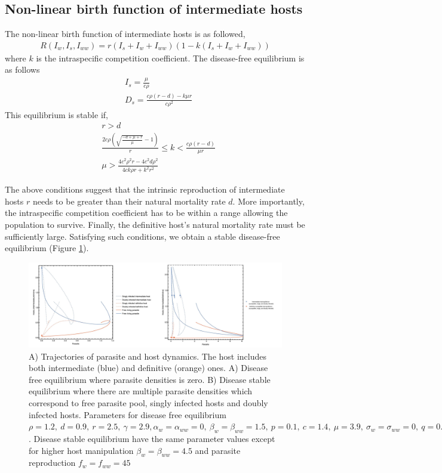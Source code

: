 \documentclass[11pt]{article}
\begin{document}
\subsection*{Non-linear birth function of intermediate hosts}
The non-linear birth function of intermediate hosts is as followed,
\begin{align*}
R(I_w, I_s,I_{ww}) = r (I_s + I_w + I_{ww}) (1 - k (I_s + I_w + I_{ww}))
\end{align*}
%
where $k$ is the intraspecific competition coefficient. 
The disease-free equilibrium is as follows
%
\begin{align*}
& I_s = \frac{\mu}{c \rho } \\
& D_s = \frac{c \rho  (r-d) - k \mu  r}{c \rho ^2}
\end{align*}
%
This equilibrium is stable if,
%
\begin{align*}
& r > d \\
& \frac{2 c \rho  \left(\sqrt{\frac{-d+\mu +r}{\mu }}-1\right)}{r}\leq k < \frac{c \rho  (r-d)}{\mu  r} \\
& \mu >\frac{4 c^2 \rho ^2 r - 4 c^2 d \rho ^2}{4 c k \rho r + k^2 r^2}
\end{align*}

The above conditions suggest that the intrinsic reproduction of intermediate hosts $r$ needs to be greater than their natural mortality rate $d$. 
More importantly, the intraspecific competition coefficient has to be within a range allowing the population to survive.
Finally, the definitive host's natural mortality rate must be sufficiently large. 
Satisfying such conditions, we obtain a stable disease-free equilibrium (Figure \ref{fig:ecotraject:nonlinear}).

\begin{figure}[!ht]
\includegraphics[width=\textwidth]{Figures/ecotraject_nonlinear.jpeg}
\caption{A) Trajectories of parasite and host dynamics. The host includes both intermediate (blue) and definitive (orange) ones. A) Disease free equilibrium where parasite densities is zero. B) Disease stable equilibrium where there are multiple parasite densities which correspond to free parasite pool, singly infected hosts and doubly infected hosts. Parameters for disease free equilibrium $\rho =  1.2, \ d = 0.9, \  r = 2.5, \ \gamma =  2.9, \alpha_w = \alpha_{ww} =  0, \ \beta_w = \beta_{ww} = 1.5, \ p = 0.1, \  c = 1.4, \ \mu = 3.9, \ \sigma_w = \sigma_{ww} = 0, \ q = 0.01, \ f_w = f_{ww} = 7.5, \ \delta = 0.9, \ k = 0.26$. Disease stable equilibrium have the same parameter values except for higher host manipulation $ \beta_w =  \beta_{ww} = 4.5$ and parasite reproduction $ f_w  = f_{ww} = 45$}
\label{fig:ecotraject:nonlinear}
\end{figure}
\end{document}
